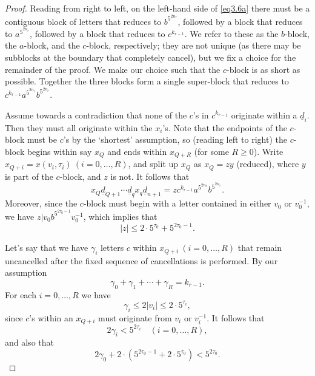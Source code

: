 \documentclass[twoside,11pt]{amsart}
\numberwithin{equation}{section}
\theoremstyle{definition}
\newcommand{\1}{\mathbbm{1}}
\newcommand{\pdt}{\underline}
\begin{document}
\begin{proof}
		Reading from right to left, on the left-hand side of \eqref{eq3.6a} there must be a contiguous block of letters that reduces to $b^{5^{2n_r}}$, followed by a block that reduces to $a^{5^{2n_r}}$, followed by a block that reduces to $c^{k_{r-1}}$. We refer to these as the $b$-block, the $a$-block, and the $c$-block, respectively; they are not unique (as there may be subblocks at the boundary that completely cancel), but we fix a choice for the remainder of the proof. We make our choice such that the $c$-block is as short as possible. Together the three blocks form a single super-block that reduces to $c^{k_{r-1}} a^{5^{2n_r}} b^{5^{2n_r}}.$
		
		Assume towards a contradiction that none of the $c$'s in $c^{k_{r-1}}$ originate within a $\pdt{d}_i$. Then they must all originate within the $x_i$'s. Note that the endpoints of the $c$-block must be $c$'s by the `shortest' assumption, so (reading left to right) the $c$-block begins within say $x_Q$ and ends within  $x_{Q+R}$ (for  some $R \geq 0$).
		Write $x_{Q+i} = x(v_i, \tau_i) \ (i = 0, \ldots, R)$, and split up $x_Q$ as $x_Q = zy$ (reduced), where $y$ is part of the $c$-block, and $z$ is not. It follows that 
		\begin{equation} 	\label{eq3.22}
			x_Q \pdt{d}_{Q+1} \cdots \pdt{d}_q x_q \pdt{d}_{n+1} = z c^{k_{r-1}} a^{5^{2n_r}} b^{5^{2n_r}}.
		\end{equation}
		Moreover, since the $c$-block must begin with a letter contained in either $v_0$ or $v_0^{-1}$, we have $z|v_0 b^{5^{2\tau_0 -1 }} v_0^{-1}$, which implies that
		\begin{equation}	\label{eq3.23}
			|z| \leq 2 \cdot 5^{\tau_0} + 5^{2 \tau_0 - 1}.
		\end{equation}
		
		Let's say that we have $\gamma_i$ letters $c$ within $x_{Q+i} \ ( i = 0, \ldots, R)$ that remain uncancelled after the fixed sequence of cancellations is performed. By our assumption
		\begin{equation}   	\label{eq3.19}
			\gamma_0+\gamma_1 + \cdots + \gamma_R = k_{r-1}.
		\end{equation}
		For each $i = 0, \ldots, R$ we have
		$$\gamma_i \leq 2 |v_i| \leq 2 \cdot 5^{\tau_i},$$
		since $c$'s within an $x_{Q+i}$ must originate from $v_i$ or $v_i^{-1}$.
		It follows that 
		\begin{equation}		\label{eq3.20}
			2 \gamma_i < 5^{2\tau_i} \quad (i = 0, \ldots, R),
		\end{equation}
		and also that
		\begin{equation} 	\label{eq3.21}
			2 \gamma_0 + 2 \cdot (5^{2\tau_0 -1} + 2 \cdot 5^{\tau_0}) < 5^{2\tau_0}.
		\end{equation}
		

\end{proof}
\end{document}
